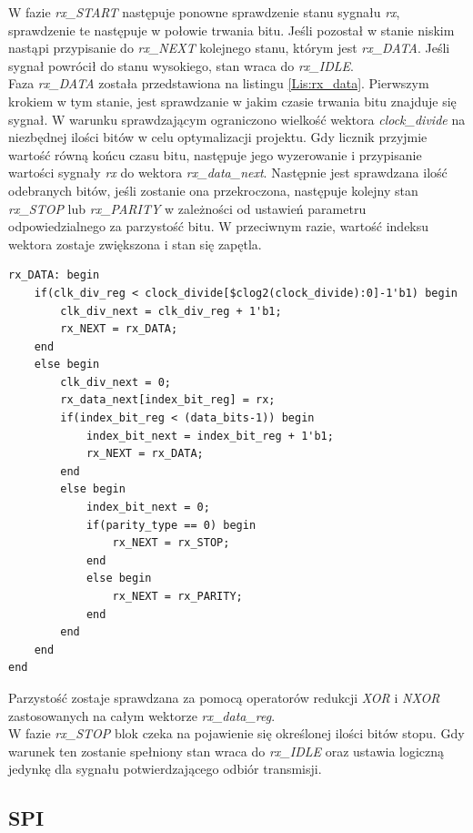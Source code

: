 \documentclass[11pt,a4paper]{article}
\begin{document}
W fazie \textit{rx\_START} następuje ponowne sprawdzenie stanu sygnału \textit{rx}, sprawdzenie te następuje w połowie trwania bitu. Jeśli pozostał w stanie niskim nastąpi przypisanie do \textit{rx\_NEXT} kolejnego stanu, którym jest \textit{rx\_DATA}. Jeśli sygnał powrócił do stanu wysokiego, stan wraca do \textit{rx\_IDLE}.\\
Faza \textit{rx\_DATA} została przedstawiona na listingu \ref{Lis:rx_data}. Pierwszym krokiem w tym stanie, jest sprawdzanie w jakim czasie trwania bitu znajduje się sygnał. W warunku sprawdzającym ograniczono wielkość wektora \textit{clock\_divide} na niezbędnej ilości bitów w celu optymalizacji projektu. Gdy licznik przyjmie wartość  równą końcu czasu bitu, następuje jego wyzerowanie i przypisanie wartości sygnały \textit{rx} do wektora \textit{rx\_data\_next}. Następnie jest sprawdzana ilość odebranych bitów, jeśli zostanie ona przekroczona, następuje kolejny stan \textit{rx\_STOP} lub \textit{rx\_PARITY} w zależności od ustawień parametru odpowiedzialnego za parzystość bitu. W przeciwnym razie, wartość indeksu wektora zostaje zwiększona i stan się zapętla.\\			\begin{minipage}{\textwidth}
\begin{scriptsize}
\begin{lstlisting}[label=Lis:rx_data,caption=Stan \textit{rx\_DATA}]
rx_DATA: begin
	if(clk_div_reg < clock_divide[$clog2(clock_divide):0]-1'b1) begin
		clk_div_next = clk_div_reg + 1'b1;
		rx_NEXT = rx_DATA;
	end
	else begin
		clk_div_next = 0;
		rx_data_next[index_bit_reg] = rx;
		if(index_bit_reg < (data_bits-1)) begin
			index_bit_next = index_bit_reg + 1'b1;
			rx_NEXT = rx_DATA;
		end
		else begin
			index_bit_next = 0;
			if(parity_type == 0) begin
				rx_NEXT = rx_STOP;
			end
			else begin
				rx_NEXT = rx_PARITY;
			end
		end
	end
end
\end{lstlisting}
\end{scriptsize}
\end{minipage}	
Parzystość zostaje sprawdzana za pomocą operatorów redukcji \textit{XOR} i \textit{NXOR} zastosowanych na całym wektorze \textit{rx\_data\_reg}. \\
W fazie \textit{rx\_STOP} blok czeka na pojawienie się określonej ilości bitów stopu. Gdy warunek ten zostanie spełniony stan wraca do \textit{rx\_IDLE} oraz ustawia logiczną jedynkę dla sygnału potwierdzającego odbiór transmisji.

	\subsection{SPI}
\end{document}
